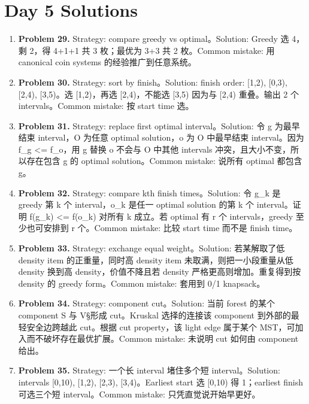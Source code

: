 \documentclass[11pt]{ctexart}
\begin{document}
\section{Day 5 Solutions}
\begin{enumerate}
  \item \textbf{Problem 29.} Strategy: compare greedy vs optimal。Solution: Greedy 选 4，剩 2，得 4+1+1 共 3 枚；最优为 3+3 共 2 枚。Common mistake: 用 canonical coin systems 的经验推广到任意系统。
  \item \textbf{Problem 30.} Strategy: sort by finish。Solution: finish order: [1,2), [0,3), [2,4), [3,5)。选 [1,2)，再选 [2,4)，不能选 [3,5) 因为与 [2,4) 重叠。输出 2 个 intervals。Common mistake: 按 start time 选。
  \item \textbf{Problem 31.} Strategy: replace first optimal interval。Solution: 令 g 为最早结束 interval，O 为任意 optimal solution，o 为 O 中最早结束 interval。因为 f\_g <= f\_o，用 g 替换 o 不会与 O 中其他 intervals 冲突，且大小不变，所以存在包含 g 的 optimal solution。Common mistake: 说所有 optimal 都包含 g。
  \item \textbf{Problem 32.} Strategy: compare kth finish times。Solution: 令 g\_k 是 greedy 第 k 个 interval，o\_k 是任一 optimal solution 的第 k 个 interval。证明 f(g\_k) <= f(o\_k) 对所有 k 成立。若 optimal 有 r 个 intervals，greedy 至少也可安排到 r 个。Common mistake: 比较 start time 而不是 finish time。
  \item \textbf{Problem 33.} Strategy: exchange equal weight。Solution: 若某解取了低 density item 的正重量，同时高 density item 未取满，则把一小段重量从低 density 换到高 density，价值不降且若 density 严格更高则增加。重复得到按 density 的 greedy form。Common mistake: 套用到 0/1 knapsack。
  \item \textbf{Problem 34.} Strategy: component cut。Solution: 当前 forest 的某个 component S 与 V\S 形成 cut。Kruskal 选择的连接该 component 到外部的最轻安全边跨越此 cut。根据 cut property，该 light edge 属于某个 MST，可加入而不破坏存在最优扩展。Common mistake: 未说明 cut 如何由 component 给出。
  \item \textbf{Problem 35.} Strategy: 一个长 interval 堵住多个短 interval。Solution: intervals [0,10), [1,2), [2,3), [3,4)。Earliest start 选 [0,10) 得 1；earliest finish 可选三个短 interval。Common mistake: 只凭直觉说开始早更好。
\end{enumerate}
\end{document}

